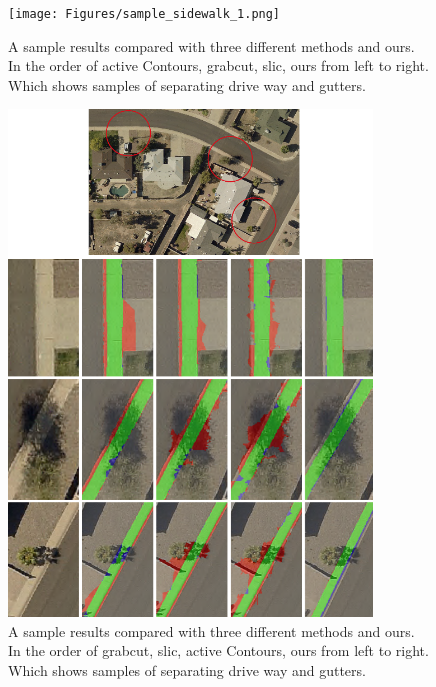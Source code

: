 \begin{figure}
    \centering
    \texttt{[image: Figures/sample\_sidewalk\_1.png]}
    \caption[Methods Comparison on Sample Sidewalk 2]{A sample results compared with three different methods and ours. In the order of active Contours, grabcut, slic, ours from left to right. Which shows samples of separating drive way and gutters.}
    \label{fig:Sample_2_compare}
\end{figure}

\begin{figure}
    \centering
    \includegraphics[width=0.86\textwidth]{Figures/2_comparison_needed.png}
    \caption[Methods Comparison on Sample Sidewalk 3]{A sample results compared with three different methods and ours. In the order of grabcut, slic, active Contours, ours from left to right. Which shows samples of separating drive way and gutters.}
    \label{fig:Sample_3_compare}
\end{figure}



